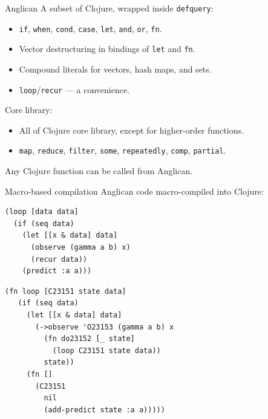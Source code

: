 \documentclass{beamer}
\begin{document}
\begin{frame}{Anglican}
    A subset of Clojure, wrapped inside \texttt{defquery}:
    \begin{itemize}
        \item \texttt{if}, \texttt{when}, \texttt{cond},
            \texttt{case}, \texttt{let}, \texttt{and}, \texttt{or},
            \texttt{fn}. 
        \item Vector destructuring in bindings of \texttt{let} and \texttt{fn}.
        \item Compound literals for vectors, hash maps, and sets.
        \item \texttt{loop}/\texttt{recur} --- a convenience.
    \end{itemize}
    \bigskip
    Core library:
    \begin{itemize}
        \item All of Clojure core library, except for
            higher-order functions.
        \item  \texttt{map}, \texttt{reduce},
\texttt{filter}, \texttt{some}, \texttt{repeatedly},
\texttt{comp}, \texttt{partial}.
    \end{itemize}
    \bigskip
    Any Clojure function can be called from Anglican.
\end{frame}

\begin{frame}[fragile]{Macro-based compilation}
    Anglican code macro-compiled into Clojure:
    \begin{minipage}{0.48\textwidth}
\begin{verbatim}
(loop [data data]
  (if (seq data)
    (let [[x & data] data]
      (observe (gamma a b) x)
      (recur data))
    (predict :a a)))
\end{verbatim}
    \end{minipage}
    \begin{minipage}{0.44\textwidth}
    \vspace{2em}
\begin{verbatim}
(fn loop [C23151 state data]
   (if (seq data)
     (let [[x & data] data]
       (->observe 'O23153 (gamma a b) x
         (fn do23152 [_ state]
           (loop C23151 state data))
         state))
     (fn []
       (C23151
         nil
         (add-predict state :a a)))))
\end{verbatim}
    \end{minipage}
\end{frame}
\end{document}

